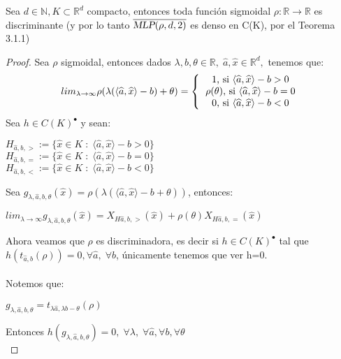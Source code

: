 \documentclass[12pt,a4paper]{book}
\providecommand{\inp}[1]{\langle#1\rangle}
\providecommand{\conj}[1]{\lbrace#1\rbrace}
\providecommand{\mlp}[1]{\textsl{MLP}(\rho,d,#1)}
\begin{document}
\begin{proposicion}{}{}
Sea $d\in\mathbb{N},K\subset\mathbb{R}^{d}$ compacto, entonces toda función sigmoidal $\rho:\mathbb{R}\rightarrow\mathbb{R}$ es discriminante (y por lo tanto $\overline{\mlp{2}}$ es denso en C(K), por el Teorema 3.1.1)
\end{proposicion}
\begin{proof}
Sea $\rho$ sigmoidal, entonces dados $\lambda,b,\theta\in\mathbb{R},\;\widehat{a},\widehat{x}\in\mathbb{R}^{d},$ tenemos que:
\begin{equation*}
lim_{\lambda\rightarrow\infty}\rho(\lambda(\inp{\widehat{a},\widehat{x}}-b)+\theta)=\left\lbrace
\begin{tabular}{c}
1, si $\inp{\widehat{a},\widehat{x}}-b>0$ \\
$\rho(\theta)$, si $\inp{\widehat{a},\widehat{x}}-b=0$\\ 
0, si $\inp{\widehat{a},\widehat{x}}-b<0$ \\ 
\end{tabular}
\right.
\end{equation*}
Sea $h\in C(K)^{\bullet}$ y sean:
\begin{center}
$H_{\widehat{a},b,>}:=\conj{\widehat{x}\in K\;:\;\inp{\widehat{a},\widehat{x}}-b>0}
$\\
$H_{\widehat{a},b,=}:=\conj{\widehat{x}\in K\;:\;\inp{\widehat{a},\widehat{x}}-b=0}$\\
$H_{\widehat{a},b,<}:=\conj{\widehat{x}\in K\;:\;\inp{\widehat{a},\widehat{x}}-b<0}$
\end{center}
Sea $g_{\lambda,\widehat{a},b,\theta}(\widehat{x})=\rho(\lambda(\inp{\widehat{a},\widehat{x}}-b+\theta))$, entonces:
\begin{center}
$lim_{\lambda\rightarrow\infty}g_{\lambda,\widehat{a},b,\theta}(\widehat{x})=X_{H\widehat{a},b,>}(\widehat{x})+\rho(\theta)X_{H\widehat{a},b,=}(\widehat{x})$
\end{center}
Ahora veamos que $\rho$ es discriminadora, es decir si $h\in C(K)^{\bullet}$ tal que $h(t_{\widehat{a},b}(\rho))=0,\forall \widehat{a},\;\forall b$, únicamente tenemos que ver h=0.\\
\\
Notemos que:
\begin{center}
$g_{\lambda,\widehat{a},b,\theta}=t_{\lambda \widehat{a},\lambda b-\theta}(\rho)$
\end{center}
Entonces $h(g_{\lambda,\widehat{a},b,\theta})=0,\;\forall \lambda,\;\forall\widehat{a},\forall b,\forall\theta$\\

\end{proof}
\end{document}

